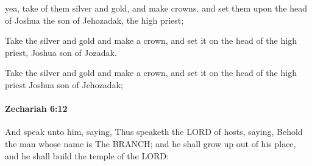 			\begin{versebox}
					\item[BHS] 
					\item[LXX] 
					\item[ASV] yea, take of them silver and gold, and make crowns, and set them upon the head of Joshua the son of Jehozadak, the high priest;
					\item[NIV] Take the silver and gold and make a crown, and set it on the head of the high priest, Joshua son of Jozadak.
					\item[NRSV] Take the silver and gold and make a crown, and set it on the head of the high priest Joshua son of Jehozadak;
			\end{versebox}

		\paragraph{Zechariah 6:12} %
			\label{ZECHARIAH-6-12}

			And speak unto him, saying, Thus speaketh the LORD of hosts, saying, Behold the man whose name is The BRANCH; and he shall grow up out of his place, and he shall build the temple of the LORD:

